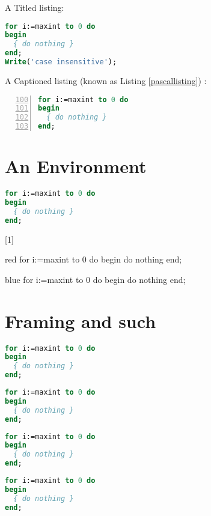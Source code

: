 \documentclass{article}
\begin{document}
A Titled listing:
\begin{lstlisting}[language=Pascal,title={A bit of Pascal}]
for i:=maxint to 0 do
begin
  { do nothing }
end;
Write('case insensitive');
\end{lstlisting}


A Captioned listing (known as Listing \ref{pascallisting}) :
\begin{lstlisting}[language=Pascal,caption=Another bit of Pascal, label=pascallisting,firstnumber=100,numbers=left]
for i:=maxint to 0 do
begin
  { do nothing }
end;
\end{lstlisting}

\section{An Environment}
\begin{lstlisting}[language=Pascal]
for i:=maxint to 0 do
begin
  { do nothing }
end;
\end{lstlisting}

[1]{}{}
\begin{colored}{red}
for i:=maxint to 0 do
begin
  { do nothing }
end;
\end{colored}

\begin{colored}{blue}
for i:=maxint to 0 do
begin
  { do nothing }
end;
\end{colored}

\section{Framing and such}
\begin{lstlisting}[language=Pascal,frame=single,rulecolor=\color{red}]
for i:=maxint to 0 do
begin
  { do nothing }
end;
\end{lstlisting}

\begin{lstlisting}[language=Pascal,frameround=tttt,backgroundcolor=\color{yellow}]
for i:=maxint to 0 do
begin
  { do nothing }
end;
\end{lstlisting}
\lstset{backgroundcolor=}
\begin{lstlisting}[language=Pascal,frame=single]
for i:=maxint to 0 do
begin
  { do nothing }
end;
\end{lstlisting}

\begin{lstlisting}[language=Pascal,frame=lines]
for i:=maxint to 0 do
begin
  { do nothing }
end;
\end{lstlisting}
\end{document}
